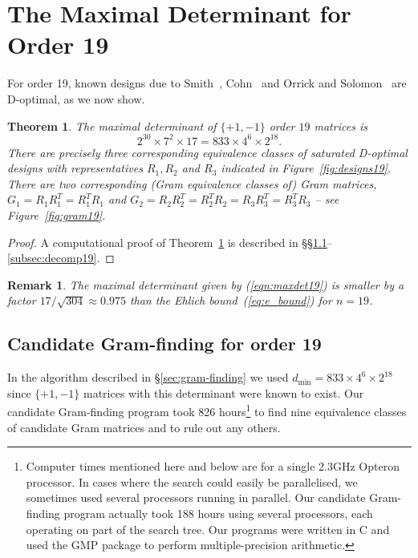 \documentclass[11pt,a4paper]{article}
\newtheorem{theorem}{Theorem}
\newtheorem{remark}{Remark}
\begin{document}
\section{The Maximal Determinant for Order 19}	\label{sec:order19}

For order 19, known designs due to Smith~\cite{Smith88}, Cohn~\cite{Cohn00}
and Orrick and Solomon~\cite{OS-19-R3} are D-optimal, as we now show.

\begin{samepage}
\begin{theorem} \label{thm:19}
The maximal determinant of $\{+1, -1\}$ order $19$ matrices  is
\begin{equation} \label{eqn:maxdet19}
2^{30} \times 7^2 \times 17 =
833 \times 4^6 \times 2^{18}.
\end{equation}
There are precisely three corresponding equivalence classes 
of saturated D-optimal designs with representatives $R_1, R_2$ and $R_3$
indicated in Figure~\ref{fig:designs19}.  There are two corresponding (Gram equivalence classes of) Gram matrices,
$G_1 = R_1R_1^T = R_1^T R_1$ and
$G_2 = R_2R_2^T = R_2^T R_2 = R_3R_3^T = R_3^T R_3$ -- see 
Figure~\ref{fig:gram19}. 
\end{theorem}
\end{samepage}

\begin{proof}
A computational proof of Theorem~\ref{thm:19} is described in
\S\S\ref{subsec:gram19}--\ref{subsec:decomp19}.
\end{proof}

\begin{remark} The maximal determinant given by {\rm(\ref{eqn:maxdet19})} 
is smaller by a factor $17/\sqrt{304} \approx 0.975$
than the Ehlich bound~{\rm(\ref{eq:e_bound})}
for $n=19$.
\end{remark}

\subsection{Candidate Gram-finding for order 19} \label{subsec:gram19}

In the algorithm described in \S\ref{sec:gram-finding}
we used $d_{\min} = 833 \times 4^6 \times
2^{18}$ since $\{+1,-1\}$ matrices with this determinant were known to
exist. Our candidate Gram-finding program took 826 hours\footnote{
Computer times mentioned here and below are for a single 2.3GHz Opteron
processor. In cases where the search could easily be parallelised,
we sometimes used several processors running in parallel. Our 
candidate Gram-finding program actually took 188 hours using several
processors, each operating on part of the search tree.
Our programs were written in C and used the GMP package 
to perform multiple-precision arithmetic.}
to find nine equivalence classes of candidate Gram matrices and to rule out
any others. 
\end{document}
